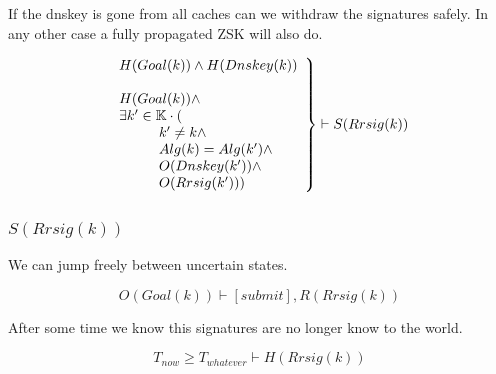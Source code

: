 \documentclass[twoside,english, a4paper]{article}
\newcommand{\mathbox}[1]{#1}
\begin{document}
\mathbox{

	If the dnskey is gone from all caches can we withdraw the 
	signatures safely. In any other case a fully propagated ZSK will 
	also do.

	\begin{equation}
		\left.
		\begin{array}{l}
\hskip 0cm			H(Goal(k)) \wedge H(Dnskey(k)) \\
\\
\hskip 0cm			H(Goal(k)) \wedge \\
\hskip 0cm			\exists k' \in \mathbb{K} \cdot ( \\
\hskip 1cm				k' \not = k  \wedge\\
\hskip 1cm				Alg(k) = Alg(k')  \wedge\\
\hskip 1cm				O(Dnskey(k'))  \wedge\\
\hskip 1cm				O(Rrsig(k')))
		\end{array}
		\right\} \vdash S(Rrsig(k))
	\end{equation}
}

\subsubsection{$S(Rrsig(k))$}

\mathbox{

	We can jump freely between uncertain states.

	\begin{equation}
		O(Goal(k)) \vdash [submit], R(Rrsig(k))
	\end{equation}

	After some time we know this signatures are no longer know to the
	world.
	
	\begin{equation}
		T_{now} \geq T_{whatever} \vdash H(Rrsig(k))
	\end{equation}
}
\end{document}
